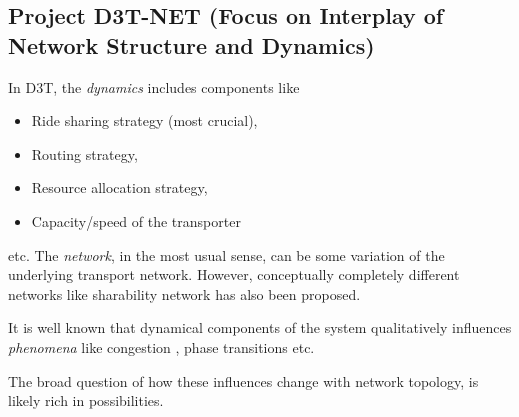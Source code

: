 \subsection*{Project D3T-NET (Focus on Interplay of Network Structure and Dynamics)}
In D3T, the \emph{dynamics} includes components like 
\begin{itemize}
\item Ride sharing strategy (most crucial),
\item Routing strategy,
\item Resource allocation strategy,
\item Capacity/speed of the transporter
\end{itemize}
etc. The \emph{network}, in the most usual sense, can be some variation of the underlying transport network. However, 
conceptually completely different networks like sharability network \cite{santi_quantifying_2014} has also been proposed. 

It is well known that dynamical components \cite{zhang_probability_2013,guan_efficient_2013,santi_quantifying_2014} of the system qualitatively influences \emph{phenomena} like
congestion \cite{hyytia_congestive_2010, de_martino_congestion_2009}, phase transitions \cite{barankai_effect_2012}  etc. 

The broad question of how these influences change with network topology, is likely rich in possibilities.
